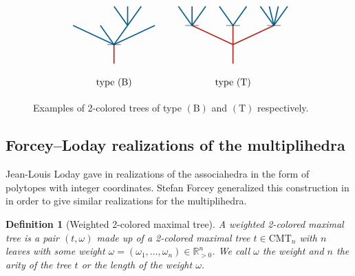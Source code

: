\documentclass[twoside, 12pt]{amsart}
\newtheorem{definition}{Definition}[section]
\theoremstyle{remark}
\newcommand{\RR}{\mathbb{R}}
\newcommand{\CMT}[1]{\mathrm{CMT}_{#1}}
\newcommand{\B}{\mathrm{B}}
\newcommand{\T}{\mathrm{T}}
\begin{document}
\begin{figure}[h]
\[\vcenter{\hbox{
\begin{tikzpicture}[yscale=0.7,xscale=1]
\draw[very thick, MidnightBlue] (0.5,1)--(0,2);
\draw[very thick, MidnightBlue] (0.5,1)--(0.5,2);
\draw[very thick, MidnightBlue] (0.5,1)--(1,2);
\draw[very thick, MidnightBlue] (0,0)--(0.5, 1); 
\draw[very thick, MidnightBlue] (0,0)--(-0.5, 1); 
\draw[very thick, MidnightBlue] (0,0)--(-1.5,1);
\draw[very thick, MidnightBlue] (0,0)--(1.5, 1);
\draw[very thick, BrickRed] (0,-1)--(0, 0); 
\draw (-0.25,0) to (0.25,0); 
\draw (0,-2) node {type $(\B)$};
\end{tikzpicture}}}\qquad \vcenter{\hbox{
\begin{tikzpicture}[yscale=0.7,xscale=1]
\draw[very thick, MidnightBlue] (-1.5,1)--(-1.5,2);
\draw[very thick, MidnightBlue] (-2,2) -- (-1.75,1.5);
\draw[very thick, MidnightBlue] (-1.25, 1.5) -- (-1,2);
\draw[very thick, MidnightBlue] (-0.5,2) -- (0,1);
\draw[very thick, MidnightBlue] (0,1)--(0.5,2);
\draw[very thick, MidnightBlue] (1.5,1)--(1,2);
\draw[very thick, MidnightBlue] (1.5,1)--(1.33,2);
\draw[very thick, MidnightBlue] (1.5,1)--(1.66,2);
\draw[very thick, MidnightBlue] (1.5,1)--(2,2);
\draw[very thick, MidnightBlue] (-1.5,1)--(-1.75, 1.5); 
\draw[very thick, MidnightBlue] (-1.5,1)--(-1.25, 1.5); 
\draw[very thick, BrickRed] (0,-1)--(0, 1); 
\draw[very thick, BrickRed] (0,0)--(-1.5,1);
\draw[very thick, BrickRed] (0,0)--(1.5, 1);
\draw (-1.75,1) to (-1.25,1); 
\draw (-0.25,1) to (0.25,1); 
\draw (1.25,1) to (1.75,1);
\draw (0,-2) node {type $(\T)$};
\end{tikzpicture}}}\]
\caption{Examples of 2-colored trees of type $(\B)$ and $(\T)$ respectively. }
\label{Fig5:FacetsColoredTrees}
\end{figure}


\subsection{Forcey--Loday realizations of the multiplihedra}
Jean-Louis Loday gave in \cite{Loday04a} realizations of the associahedra in the form of polytopes with integer coordinates. 
Stefan Forcey generalized this construction in \cite{Forcey08} in order to give similar realizations for the multiplihedra. 

\begin{definition}[Weighted 2-colored maximal tree]
A \emph{weighted 2-colored maximal tree} is a pair $(t, \omega)$ made up of a 2-colored maximal tree $t\in \CMT{n}$ with $n$ leaves with some weight $\omega= (\omega_1, \ldots, \omega_n) \in \RR_{>0}^n$. 
We call $\omega$ the \emph{weight} and
$n$ the \emph{arity} of the tree $t$ or the \emph{length} of the weight $\omega$.
\end{definition}
\end{document}

